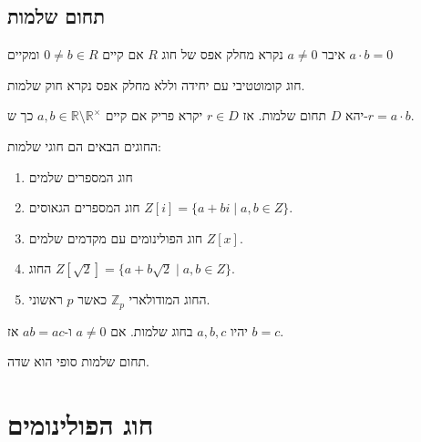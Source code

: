 \documentclass{tstextbook}
\begin{document}
\section{תחום שלמות}

\begin{definition}
איבר \(a\neq 0\) נקרא מחלק אפס של חוג \(R\) אם קיים \(0\neq b \in R\) ומקיים \(a\cdot b =0\)

\end{definition}
\begin{definition}
חוג קומוטטיבי עם יחידה וללא מחלק אפס נקרא חוק שלמות.

\end{definition}
\begin{definition}[פריקות]
יהא \(D\) תחום שלמות. אז \(r \in D\) יקרא פריק אם קיים \(a,b \in \mathbb{R} \setminus \mathbb{R}^\times\) כך ש-\(r=a\cdot b\).

\end{definition}
\begin{example}
החוגים הבאים הם חוגי שלמות:

  \begin{enumerate}
    \item חוג המספרים שלמים 


    \item חוג המספרים הגאוסים \(Z[i]=\{a+b i\mid a,b\in Z\}\). 


    \item חוג הפולינומים עם מקדמים שלמים \(Z[x]\). 


    \item החוג \(Z[{\sqrt{2}}]=\{a+b{\sqrt{2}}\mid a,b\in Z\}\). 


    \item החוג המודולארי \(\mathbb{Z}_{p}\) כאשר \(p\) ראשוני. 


  \end{enumerate}
\end{example}
\begin{proposition}
יהיו \(a,b,c\) בחוג שלמות. אם \(a\neq 0\) ו-\(ab=ac\) אז \(b=c\).

\end{proposition}
\begin{proposition}
תחום שלמות סופי הוא שדה.

\end{proposition}
\chapter{חוג הפולינומים}
\end{document}

